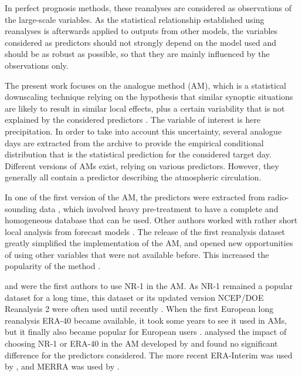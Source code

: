 \documentclass{ametsoc}
\begin{document}
In perfect prognosis methods, these reanalyses are considered as observations of the large-scale variables. As the statistical relationship established using reanalyses is afterwards applied to outputs from other models, the variables considered as predictors should not strongly depend on the model used and should be as robust as possible, so that they are mainly influenced by the observations only.

The present work focuses on the analogue method (AM), which is a statistical downscaling technique relying on the hypothesis that similar synoptic situations are likely to result in similar local effects, plus a certain variability that is not explained by the considered predictors \citep{Lorenz1969}. The variable of interest is here precipitation. In order to take into account this uncertainty, several analogue days are extracted from the archive to provide the empirical conditional distribution that is the statistical prediction for the considered target day. Different versions of AMs exist, relying on various predictors. However, they generally all contain a predictor describing the atmospheric circulation.

In one of the first version of the AM, the predictors were extracted from radio-sounding data \citep{Duband1981}, which involved heavy pre-treatment to have a complete and homogeneous database that can be used. Other authors worked with rather short local analysis from forecast models \cite[for example][]{Kruizinga1983, VandenDool1989}. The release of the first reanalysis dataset \citep[NCEP/NCAR Reanalysis I, NR-1,][]{Kalnay1996, Kistler2001} greatly simplified the implementation of the AM, and opened new opportunities of using other variables that were not available before. This increased the popularity of the method \citep{Timbal2008a}.

\citet{Timbal2003} and \citet{Bontron2004} were the first authors to use NR-1 in the AM. As NR-1 remained a popular dataset for a long time, this dataset or its updated version NCEP/DOE Reanalysis 2 \citep[NR-2,][]{Kanamitsu2002} were often used until recently \citep{Wetterhall2005a, Gangopadhyay2005, Altava-Ortiz2006, Barrera2007, Cannon2007, Matulla2007, Bliefernicht2007, Maurer2008, Wu2012, Marty2012, Teng2012, Horton2012, Yiou2014}. When the first European long reanalysis ERA-40 \citep{Uppala2005} became available, it took some years to see it used in AMs, but it finally also became popular for European users \citep {Willems2011b, JakobThemessl2011a, BenDaoud2011, Turco2011a, Franke2011, Pascual2012b, Schenk2012, Ribalaygua2013a, Osca2013, Radanovics2013, Martin2014b, Chardon2014, BenDaoud2016}. \citet{BenDaoud2009} analysed the impact of choosing NR-1 or ERA-40 in the AM developed by \citet{Bontron2004} and found no significant difference for the predictors considered. The more recent ERA-Interim \citep[ERA-INT, ][]{Dee2011a} was used by \cite{Raynaud2016b}, and MERRA was used by \citet{Vanvyve2015}.
\end{document}
